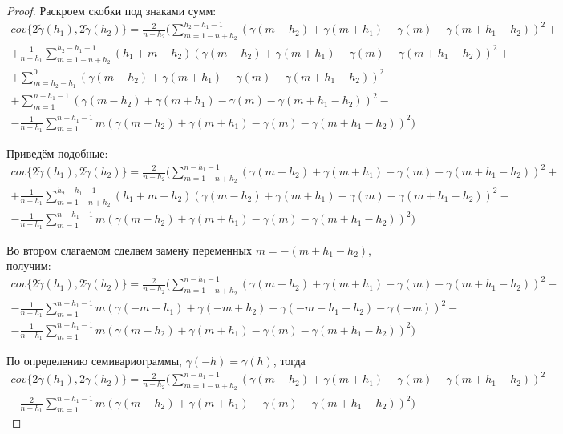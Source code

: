 \begin{proof}
Раскроем скобки под знаками сумм:
\begin{multline*}
	cov\{ 2 \tilde{\gamma}(h_1), 2 \tilde{\gamma}(h_2) \} = \frac{2}{n - h_2} (\sum_{m = 1 - n + h_2}^{h_2 - h_1 - 1} (\gamma(m - h_2) + \gamma(m + h_1) - \gamma(m) - \gamma(m + h_1 - h_2))^2 + \\
	+ \frac{1}{n - h_1} \sum_{m = 1 - n + h_2}^{h_2 - h_1 - 1} (h_1 + m - h_2)(\gamma(m - h_2) + \gamma(m + h_1) - \gamma(m) - \gamma(m + h_1 - h_2))^2 + \\
	+ \sum_{m = h_2 - h_1}^{0}(\gamma(m - h_2) + \gamma(m + h_1) - \gamma(m) - \gamma(m + h_1 - h_2))^2 + \\
	+ \sum_{m = 1}^{n - h_1 - 1}(\gamma(m - h_2) + \gamma(m + h_1) - \gamma(m) - \gamma(m + h_1 - h_2))^2 - \\
	- \frac{1}{n - h_1} \sum_{m = 1}^{n - h_1 - 1} m (\gamma(m - h_2) + \gamma(m + h_1) - \gamma(m) - \gamma(m + h_1 - h_2))^2)
\end{multline*}

Приведём подобные:
\begin{multline*}
	cov\{ 2 \tilde{\gamma}(h_1), 2 \tilde{\gamma}(h_2) \} = \frac{2}{n - h_2} (\sum_{m = 1 - n + h_2}^{n - h_1 - 1} (\gamma(m - h_2) + \gamma(m + h_1) - \gamma(m) - \gamma(m + h_1 - h_2))^2 + \\
	+ \frac{1}{n - h_1} \sum_{m = 1 - n + h_2}^{h_2 - h_1 - 1} (h_1 + m - h_2)(\gamma(m - h_2) + \gamma(m + h_1) - \gamma(m) - \gamma(m + h_1 - h_2))^2 - \\
	- \frac{1}{n - h_1} \sum_{m = 1}^{n - h_1 - 1} m (\gamma(m - h_2) + \gamma(m + h_1) - \gamma(m) - \gamma(m + h_1 - h_2))^2)
\end{multline*}

Во втором слагаемом сделаем замену переменных $ m = -(m + h_1 - h_2) $, получим:
\begin{multline*}
	cov\{ 2 \tilde{\gamma}(h_1), 2 \tilde{\gamma}(h_2) \} = \frac{2}{n - h_2} (\sum_{m = 1 - n + h_2}^{n - h_1 - 1} (\gamma(m - h_2) + \gamma(m + h_1) - \gamma(m) - \gamma(m + h_1 - h_2))^2 - \\
	- \frac{1}{n - h_1} \sum_{m = 1}^{n - h_1 - 1} m (\gamma(-m - h_1) + \gamma(-m + h_2) - \gamma(-m - h_1 + h_2) - \gamma(-m))^2 - \\
	- \frac{1}{n - h_1} \sum_{m = 1}^{n - h_1 - 1} m (\gamma(m - h_2) + \gamma(m + h_1) - \gamma(m) - \gamma(m + h_1 - h_2))^2)
\end{multline*}

По определению семивариограммы, $ \gamma(-h) = \gamma(h) $, тогда
\begin{multline*}
	cov\{ 2 \tilde{\gamma}(h_1), 2 \tilde{\gamma}(h_2) \} = \frac{2}{n - h_2} (\sum_{m = 1 - n + h_2}^{n - h_1 - 1} (\gamma(m - h_2) + \gamma(m + h_1) - \gamma(m) - \gamma(m + h_1 - h_2))^2 - \\
	- \frac{2}{n - h_1} \sum_{m = 1}^{n - h_1 - 1} m (\gamma(m - h_2) + \gamma(m + h_1) - \gamma(m) - \gamma(m + h_1 - h_2))^2)
\end{multline*}


\end{proof}
